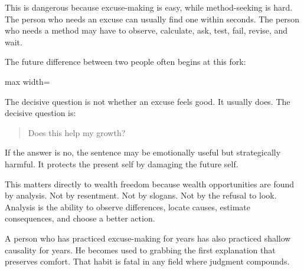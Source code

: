 This is dangerous because excuse-making is easy, while method-seeking is hard. The person who needs an excuse can usually find one within seconds. The person who needs a method may have to observe, calculate, ask, test, fail, revise, and wait.

The future difference between two people often begins at this fork:

\begin{center}
\begin{adjustbox}{max width=\linewidth}
\end{adjustbox}
\end{center}

The decisive question is not whether an excuse feels good. It usually does. The decisive question is:

\begin{quote}
Does this help my growth?
\end{quote}

If the answer is no, the sentence may be emotionally useful but strategically harmful. It protects the present self by damaging the future self.

This matters directly to wealth freedom because wealth opportunities are found by analysis. Not by resentment. Not by slogans. Not by the refusal to look. Analysis is the ability to observe differences, locate causes, estimate consequences, and choose a better action.

A person who has practiced excuse-making for years has also practiced shallow causality for years. He becomes used to grabbing the first explanation that preserves comfort. That habit is fatal in any field where judgment compounds.

